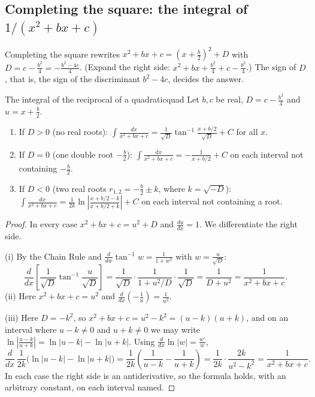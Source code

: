 \documentclass[11pt]{article}
\begin{document}
\subsection*{Completing the square: the integral of $1/(x^2+bx+c)$}

Completing the square rewrites $x^2+bx+c=\left(x+\frac b2\right)^2+D$ with $D=c-\frac{b^2}4=-\frac{b^2-4c}4$. (Expand the right side: $x^2+bx+\frac{b^2}4+c-\frac{b^2}4$.) The sign of $D$, that is, the sign of the discriminant $b^2-4c$, decides the answer.

\begin{thm}{The integral of the reciprocal of a quadratic}{quad}
Let $b,c$ be real, $D=c-\frac{b^2}4$ and $u=x+\frac b2$.
\begin{enumerate}[label=(\roman*)]
  \item If $D>0$ (no real roots): $\displaystyle\int\frac{dx}{x^2+bx+c}=\frac1{\sqrt D}\tan^{-1}\frac{x+b/2}{\sqrt D}+C$ for all $x$.
  \item If $D=0$ (one double root $-\frac b2$): $\displaystyle\int\frac{dx}{x^2+bx+c}=-\frac1{x+b/2}+C$ on each interval not containing $-\frac b2$.
  \item If $D<0$ (two real roots $r_{1,2}=-\frac b2\pm k$, where $k=\sqrt{-D}$): $\displaystyle\int\frac{dx}{x^2+bx+c}=\frac1{2k}\ln\left\lvert\frac{x+b/2-k}{x+b/2+k}\right\rvert+C$ on each interval not containing a root.
\end{enumerate}
\end{thm}
\begin{proof}
In every case $x^2+bx+c=u^2+D$ and $\frac{du}{dx}=1$. We differentiate the right side.

(i) By the Chain Rule and $\frac{d}{dw}\tan^{-1}w=\frac1{1+w^2}$ with $w=\frac u{\sqrt D}$:
\[\frac{d}{dx}\left[\frac1{\sqrt D}\tan^{-1}\frac u{\sqrt D}\right]=\frac1{\sqrt D}\cdot\frac1{1+u^2/D}\cdot\frac1{\sqrt D}=\frac1{D+u^2}=\frac1{x^2+bx+c}.\]
(ii) Here $x^2+bx+c=u^2$ and $\frac{d}{dx}\left(-\frac1u\right)=\frac1{u^2}$.

(iii) Here $D=-k^2$, so $x^2+bx+c=u^2-k^2=(u-k)(u+k)$, and on an interval where $u-k\ne0$ and $u+k\ne0$ we may write $\ln\left\lvert\frac{u-k}{u+k}\right\rvert=\ln\lvert u-k\rvert-\ln\lvert u+k\rvert$. Using $\frac{d}{dx}\ln\lvert w\rvert=\frac{w'}w$,
\[\frac{d}{dx}\,\frac1{2k}\Big(\ln\lvert u-k\rvert-\ln\lvert u+k\rvert\Big)=\frac1{2k}\left(\frac1{u-k}-\frac1{u+k}\right)=\frac1{2k}\cdot\frac{2k}{u^2-k^2}=\frac1{x^2+bx+c}.\]
In each case the right side is an antiderivative, so the formula holds, with an arbitrary constant, on each interval named.
\end{proof}
\end{document}
